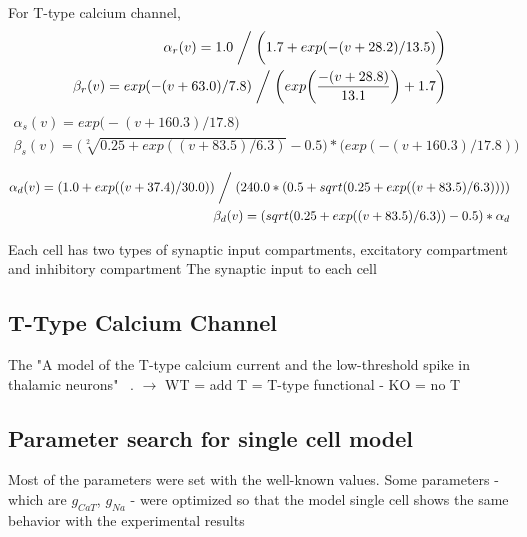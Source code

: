 For T-type calcium channel, %
\begin{align*} %
\alpha_{r}(v) = 1.0\biggm/ \bigg(1.7+exp(-(v+28.2)/13.5)\bigg)  \\
\beta_{r}(v) = exp(-(v+63.0)/7.8) \biggm/  \bigg( exp \bigg( \frac{-(v+28.8)}{13.1} \bigg) +1.7\bigg)\\
\end{align*}
\begin{align*} %
\alpha_{s}(v) = exp \bigg (-(v+160.3)/17.8\bigg)\\
\beta_{s}(v)  =  \bigg(\sqrt[2]{0.25+exp((v+83.5)/6.3)}-0.5\bigg) *  \bigg(exp(-(v+160.3)/17.8)\bigg)\\
\end{align*}
\begin{align*} %
\alpha_{d}(v) =  (1.0+exp((v+37.4)/30.0)) \biggm/ (240.0*(0.5+ sqrt(0.25+exp((v+83.5)/6.3)) )) \\
\beta_{d}(v)  = (sqrt(0.25+exp((v+83.5)/6.3))-0.5)*\alpha_d\\  
\end{align*}

%
%
%
%
Each cell has two types of synaptic input compartments, excitatory compartment and inhibitory compartment
The synaptic input to each cell



\subsection{T-Type Calcium Channel}
The  "A model of the T-type calcium current and the low-threshold spike in thalamic neurons" ~\cite{wang1991model}.
$\rightarrow$ WT =  add T = T-type functional 
- KO = no T 

\subsection{Parameter search for single cell model}
Most of the parameters were set with the well-known values. Some parameters - which are 
$g_{CaT}$, $g_{Na}$ - were optimized so that the model single cell shows the same behavior with the experimental results

